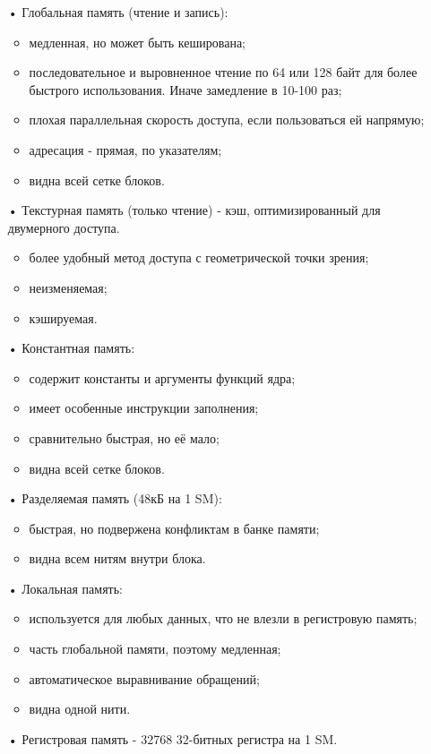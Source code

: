 \documentclass[a4paper,14pt,russian]{extreport}
\begin{document}
  \begin{itemize}
  \item[•] Глобальная память (чтение и запись):
    \begin{itemize}
    \item медленная, но может быть кеширована;
    \item последовательное и выровненное чтение по 64 или 128 байт для более быстрого использования. Иначе замедление в 10-100 раз;
    \item плохая параллельная скорость доступа, если пользоваться ей напрямую;
    \item адресация - прямая, по указателям;
    \item видна всей сетке блоков. 
    \end{itemize}
  \item[•] Текстурная память (только чтение) - кэш, оптимизированный для двумерного доступа.
    \begin{itemize}
    \item более удобный метод доступа с геометрической точки зрения;
    \item неизменяемая;
    \item кэшируемая.
    \end{itemize}
  \item[•] Константная память:
    \begin{itemize}
    \item содержит константы и аргументы функций ядра;
    \item имеет особенные инструкции заполнения;
    \item сравнительно быстрая, но её мало;
    \item видна всей сетке блоков. 
    \end{itemize}
  \item[•] Разделяемая память (48кБ на 1 SM):
    \begin{itemize}
    \item быстрая, но подвержена конфликтам в банке памяти;
    \item видна всем нитям внутри блока.
    \end{itemize}
  \item[•] Локальная память:
    \begin{itemize}
    \item используется для любых данных, что не влезли в регистровую память;
    \item часть глобальной памяти, поэтому медленная;
    \item автоматическое выравнивание обращений;
    \item видна одной нити.
    \end{itemize}
  \item[•] Регистровая память - 32768 32-битных регистра на 1 SM.
  \end{itemize}
\end{document}
